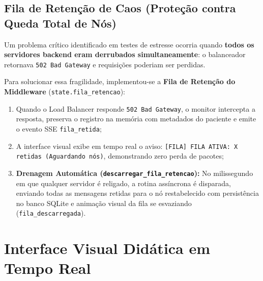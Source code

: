 \documentclass[12pt,a4paper]{article}
\begin{document}
\subsection{Fila de Retenção de Caos (Proteção contra Queda Total de Nós)}
Um problema crítico identificado em testes de estresse ocorria quando \textbf{todos os servidores backend eram derrubados simultaneamente}: o balanceador retornava \texttt{502 Bad Gateway} e requisições poderiam ser perdidas.

Para solucionar essa fragilidade, implementou-se a \textbf{Fila de Retenção do Middleware} (\texttt{state.fila\_retencao}):
\begin{enumerate}
	\item Quando o Load Balancer responde \texttt{502 Bad Gateway}, o monitor intercepta a resposta, preserva o registro na memória com metadados do paciente e emite o evento SSE \texttt{fila\_retida};
	\item A interface visual exibe em tempo real o aviso: \texttt{[FILA] FILA ATIVA: X retidas (Aguardando nós)}, demonstrando zero perda de pacotes;
	\item \textbf{Drenagem Automática (\texttt{descarregar\_fila\_retencao}):} No milissegundo em que qualquer servidor é religado, a rotina assíncrona é disparada, enviando todas as mensagens retidas para o nó restabelecido com persistência no banco SQLite e animação visual da fila se esvaziando (\texttt{fila\_descarregada}).
\end{enumerate}

\section{Interface Visual Didática em Tempo Real}
\end{document}
